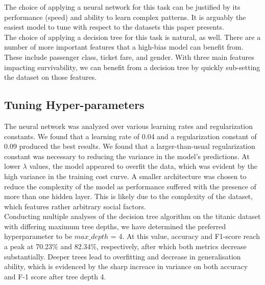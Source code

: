\documentclass{article}
\begin{document}
The choice of applying a neural network for this task can be justified by its performance (speed) and ability to learn complex patterns. 
It is arguably the easiest model to tune with respect to the datasets this paper presents.
\\

The choice of applying a decision tree for this task is natural, as well. There are a number of more important features that a high-bias model can benefit from. These
include passenger class, ticket fare, and gender. With three main features impacting survivability, we can benefit from a decision tree by quickly sub-setting the dataset on those features.

\subsection*{Tuning Hyper-parameters}

The neural network was analyzed over various learning rates and regularization constants. We found that a learning rate of 0.04 and a regularization constant of 0.09 produced the best results.
We found that a larger-than-usual regularization constant was necessary to reducing the variance in the model's predictions. At lower $\lambda$ values, the model appeared to overfit the data, which was evident by the high variance in the training cost curve.
A smaller architecture was chosen to reduce the complexity of the model as performance suffered with the presence of more than one hidden layer.
This is likely due to the complexity of the dataset, which features rather arbitrary social factors.
\\

Conducting multiple analyses of the decision tree algorithm on the titanic dataset with differing maximum tree depths,
we have determined the preferred hyperparameter to be $max\_depth$ = 4. 
At this value, accuracy and F1-score reach a peak at 70.23\% and 82.34\%, respectively, after which both metrics decrease substantially.
Deeper trees lead to overfitting and decrease in generalisation ability, 
which is evidenced by the sharp increace in variance on both accuracy and F-1 score after tree depth 4.
\end{document}
